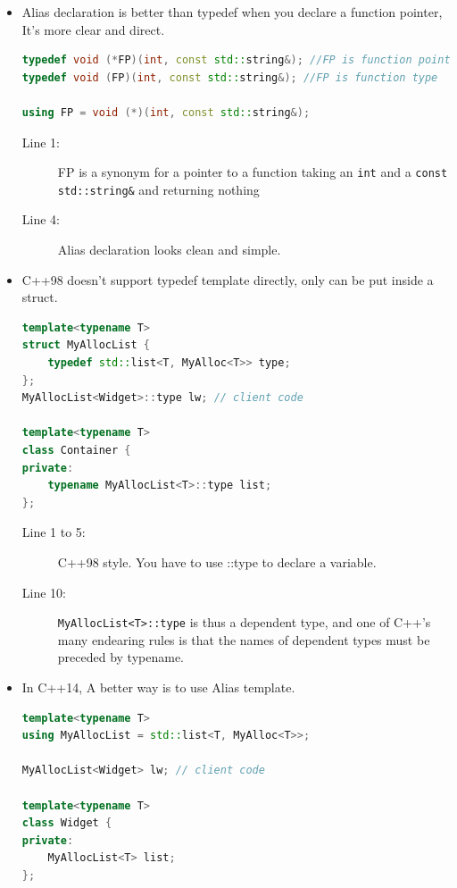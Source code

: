 \documentclass[a4paper,11pt,twoside]{book}
\begin{document}
\begin{itemize}
    \item Alias declaration is better than typedef when you declare a function pointer, It's more clear and direct.
\begin{lstlisting}[frame=single, language=c++]
typedef void (*FP)(int, const std::string&); //FP is function pointer type
typedef void (FP)(int, const std::string&); //FP is function type

using FP = void (*)(int, const std::string&);
\end{lstlisting}

\begin{description}
	\item[Line 1:] FP is a synonym for a pointer to a function taking an \texttt{int} and a \texttt{const std::string\&} and returning nothing
	\item[Line 4:] Alias declaration looks clean and simple.
\end{description}

    \item C++98 doesn't support typedef template directly, only can be put inside a struct.
\begin{lstlisting}[frame=single, language=c++]
template<typename T>
struct MyAllocList {
	typedef std::list<T, MyAlloc<T>> type;
};
MyAllocList<Widget>::type lw; // client code

template<typename T>
class Container { 
private:
	typename MyAllocList<T>::type list; 
};
\end{lstlisting}
\begin{description}
	\item[Line 1 to 5:] C++98 style. You have to use ::type to declare a variable.
	\item[Line 10:] \texttt{MyAllocList<T>::type} is thus a dependent type, and one of C++'s many endearing rules is that the names of dependent types must be preceded by typename.
\end{description}


\item In C++14, A better way is to use Alias template.

\begin{lstlisting}[frame=single, language=c++]
template<typename T> 
using MyAllocList = std::list<T, MyAlloc<T>>;

MyAllocList<Widget> lw; // client code

template<typename T>
class Widget {
private:
	MyAllocList<T> list; 
};
\end{lstlisting}



\end{itemize}
\end{document}
